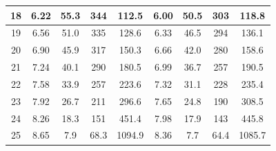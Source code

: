 \documentclass[12pt]{article}
\begin{document}
\begin{table}[H]
\begin{tabular}{|c|c|c|c|c|c|c|c|c|}
18 & 6.22        & 55.3   &344  &112.5    & 6.00        & 50.5     &303   &118.8 \\ \hline
19 & 6.56        & 51.0   &335  &128.6    & 6.33        & 46.5     &294   &136.1 \\ \hline
20 & 6.90        & 45.9   &317  &150.3    & 6.66        & 42.0     &280   &158.6 \\ \hline
21 & 7.24        & 40.1   &290  &180.5    & 6.99        & 36.7     &257   &190.5 \\ \hline
22 & 7.58        & 33.9   &257  &223.6    & 7.32        & 31.1     &228   &235.4 \\ \hline
23 & 7.92        & 26.7   &211  &296.6    & 7.65        & 24.8     &190   &308.5 \\ \hline
24 & 8.26        & 18.3   &151  &451.4    & 7.98        & 17.9     &143   &445.8 \\ \hline
25 & 8.65        & 7.9    &68.3 &1094.9    & 8.36        & 7.7      &64.4  &1085.7  \\ \hline
\end{tabular}
\end{table}
\end{document}
